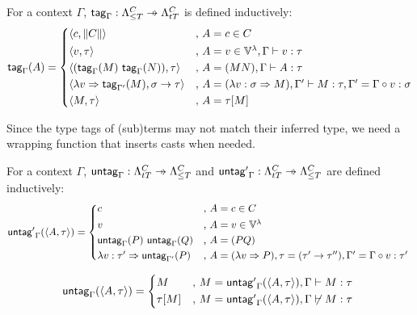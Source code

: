 \documentclass[main.tex]{subfiles}
\begin{document}
\begin{defn}
    \label{def:ttag}
    For a context $\Gamma$,
    $\mcf{tag}_{\Gamma} : \fancylambda{T}{C} \pfun \ttlambda{T}{C}$
    is defined inductively:
    \[
        \mcf{tag}_{\Gamma}(A) =
        \begin{cases*}
            \ttt{c}{\typeof{C}} &,  $A = c \in C$ \\
            \ttt{v}{\tau} &, $A = v \in \lvars, \Gamma \vdash v : \tau$ \\
            \ttt{(\mcf{tag}_{\Gamma}(M) \app \mcf{tag}_{\Gamma}(N))}{\tau}
                &, $A = (MN), \Gamma \vdash A : \tau$ \\
            \ttt{\lambda v \abstr \mcf{tag}_{\Gamma'}(M)}{\sigma \tot \tau}
                &, $A = (\lambda v: \sigma \abstr M)
                 , \Gamma' \vdash M : \tau
                 , \Gamma' = \Gamma \circ v : \sigma$\\
            \ttt{M}{\tau} &, $A = \tau[M]$ \\
        \end{cases*}
    \]
\end{defn}

Since the type tags of (sub)terms may not match their inferred type,
we need a wrapping function that inserts casts when needed.
\begin{defn}
    For a context $\Gamma$,
    $\mcf{untag}_{\Gamma} : \ttlambda{T}{C} \pfun \fancylambda{T}{C}$
    and
    $\mcf{untag'}_{\Gamma} : \ttlambda{T}{C} \pfun \fancylambda{T}{C}$
    are defined inductively:
    \[
        \mcf{untag'}_{\Gamma}(\ttt{A}{\tau}) =
        \begin{cases*}
            c &, $A = c \in C$ \\
            v &, $A = v \in \lvars$ \\
            \mcf{untag}_{\Gamma}(P) \app \mcf{untag}_{\Gamma}(Q)
                &, $A = (PQ)$ \\
            \lambda v : \tau' \abstr \mcf{untag}_{\Gamma'}(P)
                &, $A = (\lambda v \abstr P), \tau = (\tau' \tot \tau'')
                 , \Gamma' = \Gamma \circ v : \tau'$ \\
        \end{cases*}
    \]

    \[
        \mcf{untag}_{\Gamma}(\ttt{A}{\tau}) =
        \begin{cases*}
            M &, $M = \mcf{untag'}_{\Gamma}(\ttt{A}{\tau}), \Gamma \vdash M : \tau$ \\
            \tau[M] &, $M = \mcf{untag'}_{\Gamma}(\ttt{A}{\tau}), \Gamma \not\vdash M : \tau$ \\
        \end{cases*}
    \]
\end{defn}
\end{document}
